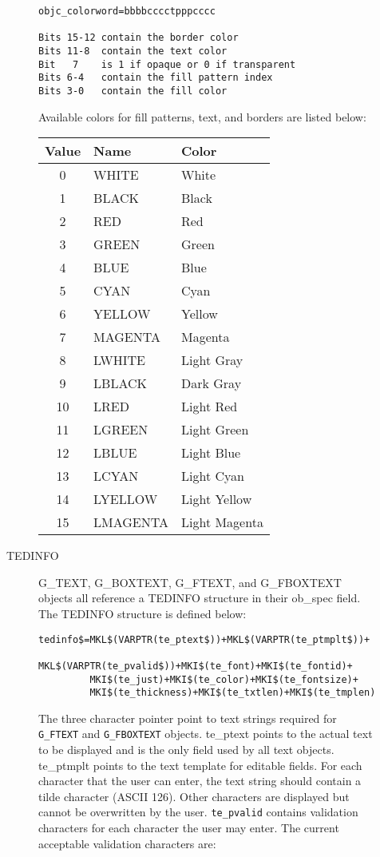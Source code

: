 \begin{description}
\begin{description}
{\footnotesize
\begin{verbatim}
objc_colorword=bbbbcccctpppcccc

Bits 15-12 contain the border color 
Bits 11-8  contain the text color 
Bit   7    is 1 if opaque or 0 if transparent 
Bits 6-4   contain the fill pattern index 
Bits 3-0   contain the fill color 
\end{verbatim}}

Available colors for fill patterns, text, and borders are listed
below:
\begin{center}
\begin{tabular}{|cll|}
\hline
{\bf Value} &{\bf  Name}&{\bf  Color}  \\
\hline
 0&  WHITE	&  White\\
 1&  BLACK	&  Black\\
 2&  RED	&  Red\\
 3&  GREEN	&  Green\\
 4&  BLUE	&  Blue\\
 5&  CYAN	&  Cyan\\
 6&  YELLOW	&  Yellow\\
 7&  MAGENTA	&  Magenta\\
 8&  LWHITE	&  Light Gray\\
 9&  LBLACK	&  Dark Gray\\
 10& LRED	&  Light Red\\
 11& LGREEN	&  Light Green\\
 12& LBLUE	&  Light Blue\\
 13& LCYAN	&  Light Cyan\\
 14& LYELLOW	&  Light Yellow\\
 15& LMAGENTA	&  Light Magenta\\
\hline
\end{tabular}
\end{center}


\item[TEDINFO]
G\_TEXT, G\_BOXTEXT, G\_FTEXT, and G\_FBOXTEXT objects all reference a
TEDINFO structure in their ob\_spec field. The TEDINFO structure is
defined below:
 {\footnotesize
\begin{verbatim}                                                         
tedinfo$=MKL$(VARPTR(te_ptext$))+MKL$(VARPTR(te_ptmplt$))+
         MKL$(VARPTR(te_pvalid$))+MKI$(te_font)+MKI$(te_fontid)+
         MKI$(te_just)+MKI$(te_color)+MKI$(te_fontsize)+
         MKI$(te_thickness)+MKI$(te_txtlen)+MKI$(te_tmplen)
\end{verbatim}}

The three character pointer point to text strings required for 
\verb|G_FTEXT|
and \verb|G_FBOXTEXT| objects. te\_ptext points to the actual text to be
displayed and is the only field used by all text objects. te\_ptmplt
points to the text template for editable fields. For each character
that the user can enter, the text string should contain a tilde
character (ASCII 126). Other characters are displayed but cannot be
overwritten by the user. \verb|te_pvalid| contains validation characters for
each character the user may enter. The current acceptable validation
characters are:


\end{description}
\end{description}
